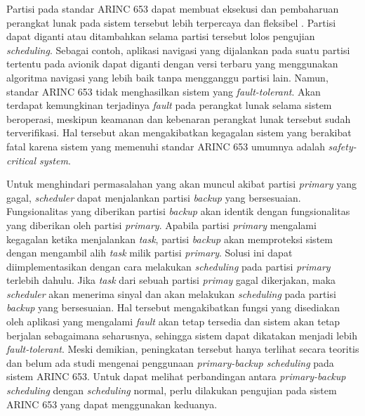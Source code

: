 Partisi pada standar ARINC 653 dapat membuat eksekusi dan pembaharuan perangkat lunak pada sistem tersebut lebih terpercaya dan fleksibel \citep{Jin2013}.
Partisi dapat diganti atau ditambahkan selama partisi tersebut lolos pengujian \textit{scheduling}.
Sebagai contoh, aplikasi navigasi yang dijalankan pada suatu partisi tertentu pada avionik dapat diganti dengan versi terbaru yang menggunakan algoritma navigasi yang lebih baik tanpa mengganggu partisi lain.
Namun, standar ARINC 653 tidak menghasilkan sistem yang \textit{fault-tolerant}.
Akan terdapat kemungkinan terjadinya \textit{fault} pada perangkat lunak selama sistem beroperasi, meskipun keamanan dan kebenaran perangkat lunak tersebut sudah terverifikasi.
Hal tersebut akan mengakibatkan kegagalan sistem yang berakibat fatal karena sistem yang memenuhi standar ARINC 653 umumnya adalah \textit{safety-critical system}.

Untuk menghindari permasalahan yang akan muncul akibat partisi \textit{primary} yang gagal, \textit{scheduler} dapat menjalankan partisi \textit{backup} yang bersesuaian.
Fungsionalitas yang diberikan partisi \textit{backup} akan identik dengan fungsionalitas yang diberikan oleh partisi \textit{primary}.
Apabila partisi \textit{primary} mengalami kegagalan ketika menjalankan \textit{task}, partisi \textit{backup} akan memproteksi sistem dengan mengambil alih \textit{task} milik partisi \textit{primary}.
Solusi ini dapat diimplementasikan dengan cara melakukan \textit{scheduling} pada partisi \textit{primary} terlebih dahulu.
Jika \textit{task} dari sebuah partisi \textit{primay} gagal dikerjakan, maka \textit{scheduler} akan menerima sinyal dan akan melakukan \textit{scheduling} pada partisi \textit{backup} yang bersesuaian.
Hal tersebut mengakibatkan fungsi yang disediakan oleh aplikasi yang mengalami \textit{fault} akan tetap tersedia dan sistem akan tetap berjalan sebagaimana seharusnya, sehingga sistem dapat dikatakan menjadi lebih \textit{fault-tolerant}.
Meski demikian, peningkatan tersebut hanya terlihat secara teoritis dan belum ada studi mengenai penggunaan \textit{primary-backup scheduling} pada sistem ARINC 653.
Untuk dapat melihat perbandingan antara \textit{primary-backup scheduling} dengan \textit{scheduling} normal, perlu dilakukan pengujian pada sistem ARINC 653 yang dapat menggunakan keduanya.

